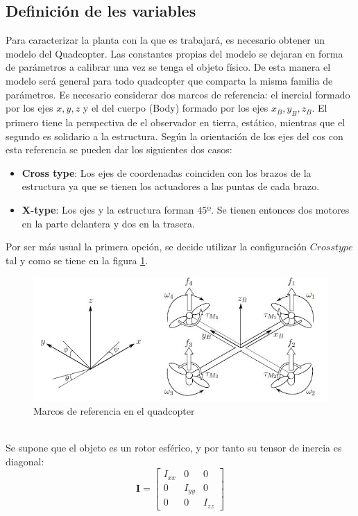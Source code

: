 \documentclass[twoside]{article}
\begin{document}
\subsection{Definición de les variables}
Para caracterizar la planta con la que es trabajará, es necesario obtener un modelo del Quadcopter. Las constantes propias del modelo se dejaran en forma de parámetros a calibrar una vez se tenga el objeto físico. De esta manera el modelo será general para todo quadcopter que comparta la misma familia de parámetros.
Es necesario considerar dos marcos de referencia: el inercial formado por los ejes $x,y,z$ y el del cuerpo (Body) formado por los ejes $x_B,y_B,z_B$. El primero tiene la perspectiva de el observador en tierra, estático, mientras que el segundo es solidario a la estructura. Según la orientación de los ejes del cos con esta referencia se pueden dar los siguientes dos casos:
\begin{itemize}
\item \textbf{Cross type}: Los ejes de coordenadas coinciden con los brazos de la estructura ya que se tienen los actuadores a las puntas de cada brazo.
\item \textbf{X-type}: Los ejes y la estructura forman $45º$. Se tienen entonces dos motores en la parte delantera y dos en la trasera.
\end{itemize} 
Por ser más usual la primera opción, se decide utilizar la configuración $Cross type$ tal y como se tiene en la figura \ref{RefQuad}.
\begin{figure}[h!]
\centering
\includegraphics[scale=0.5]{images/quad.jpg}
\caption{Marcos de referencia en el quadcopter}
\label{RefQuad}
\end{figure}\\
Se supone que el objeto es un rotor esférico, y por tanto su tensor de inercia es diagonal:
\begin{equation}\textbf{I}=\left[ \begin{array}{ccc}
I_{xx} & 0 & 0 \\
0 & I_{yy} & 0 \\
0 & 0 & I_{zz} 
\end{array} \right] \end{equation}
\end{document}
